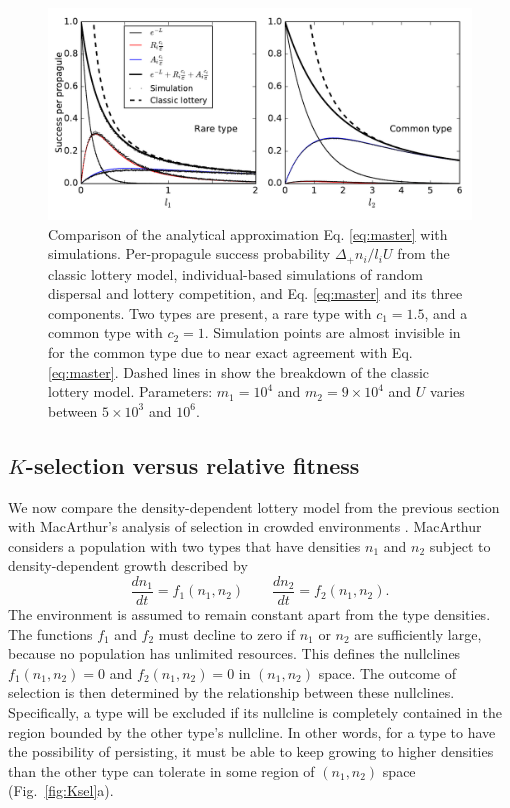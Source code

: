 \documentclass[11pt]{article}
\begin{document}
\begin{figure}
\centering
\includegraphics[scale=0.8]{simulationcomparison.pdf}
\caption{\label{fig:simcomp} Comparison of the analytical approximation Eq. \eqref{eq:master} with simulations. Per-propagule success probability $\Delta_+ n_i/l_i U$ from the classic lottery model, individual-based simulations of random dispersal and lottery competition, and Eq. \eqref{eq:master} and its three components. Two types are present, a rare type with $c_1=1.5$, and a common type with $c_2=1$. Simulation points are almost invisible in for the common type due to near exact agreement with Eq. \eqref{eq:master}. Dashed lines in show the breakdown of the classic lottery model. Parameters: $m_1=10^4$ and $m_2=9\times 10^4$ and $U$ varies between $5\times 10^3$ and $10^6$.} 
\end{figure}

\subsection*{$K$-selection versus relative fitness}

We now compare the density-dependent lottery model from the previous section with MacArthur's analysis of selection in crowded environments \citep{macarthur_1967}. MacArthur considers a population with two types that have densities $n_1$ and $n_2$ subject to density-dependent growth described by
\begin{equation}
\frac{d n_1}{d t}=f_1(n_1,n_2)\qquad\frac{d n_2}{d t}=f_2(n_1,n_2). \label{eq:macgeneral}
\end{equation}
The environment is assumed to remain constant apart from the type densities. The functions $f_1$ and $f_2$ must decline to zero if $n_1$ or $n_2$ are sufficiently large, because no population has unlimited resources. This defines the nullclines $f_1(n_1,n_2)=0$ and $f_2(n_1,n_2)=0$ in $(n_1,n_2)$ space. The outcome of selection is then determined by the relationship between these nullclines. Specifically, a type will be excluded if its nullcline is completely contained in the region bounded by the other type's nullcline. In other words, for a type to have the possibility of persisting, it must be able to keep growing to higher densities than the other type can tolerate in some region of $(n_1,n_2)$ space (Fig.~\ref{fig:Ksel}a).
\end{document}
